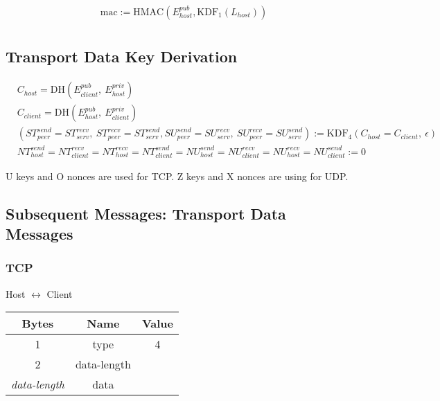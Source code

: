 \begin{align*}
    & \text{mac} := \text{HMAC}(E_{host}^{pub},\text{KDF}_1(L_{host}))\\
\end{align*}

\subsection{Transport Data Key Derivation}

\begin{align*}
    & C_{host} = \text{DH}(E_{client}^{pub},\ E_{host}^{priv})\\
    & C_{client} = \text{DH}(E_{host}^{pub},\ E_{client}^{priv})\\
    & (\mathit{ST}_{peer}^{send} = \mathit{ST}_{serv}^{recv},\ \mathit{ST}_{peer}^{recv} = \mathit{ST}_{serv}^{send}, \mathit{SU}_{peer}^{send} = \mathit{SU}_{serv}^{recv},\ \mathit{SU}_{peer}^{recv} = \mathit{SU}_{serv}^{send}) := \text{KDF}_4(C_{host} = C_{client},
    \ \epsilon) \\
    & \mathit{NT}_{host}^{send} = \mathit{NT}_{client}^{recv} = \mathit{NT}_{host}^{recv} = \mathit{NT}_{client}^{send} = \mathit{NU}_{host}^{send} = \mathit{NU}_{client}^{recv} = \mathit{NU}_{host}^{recv} = \mathit{NU}_{client}^{send} := 0
\end{align*}

U keys and O nonces are used for TCP. Z keys and X nonces are using for UDP.

\subsection{Subsequent Messages: Transport Data Messages}

\subsubsection{TCP}

\begin{center}
    Host $\leftrightarrow$ Client\\
    \begin{tabular}{|c|c|c|}
        \hline
        \textbf{Bytes}     & \textbf{Name} & \textbf{Value} \\
        \hline
        1                  & type          & 4              \\
        \hline
        2                  & data-length   &                \\
        \hline
        \emph{data-length} & data          &                \\
        \hline
    \end{tabular}
\end{center}

